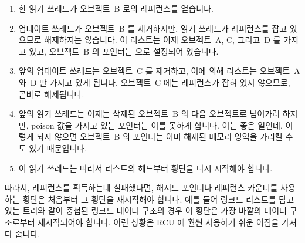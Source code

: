 \begin{enumerate}
\item	한 읽기 쓰레드가 오브젝트~B 로의 레퍼런스를 얻습니다.
\item	업데이트 쓰레드가 오브젝트~B 를 제거하지만, 읽기 쓰레드가 레퍼런스를
	잡고 있으므로 해제하지는 않습니다.
	이 리스트는 이제 오브젝트~A, C, 그리고~D 를 가지고 있고, 오브젝트~B 의
	 포인터는  으로 설정되어 있습니다.
\item	앞의 업데이트 쓰레드는 오브젝트~C 를 제거하고, 이에 의해 리스트는
	오브젝트~A 와~D 만 가지고 있게 됩니다.
	오브젝트~C 에는 레퍼런스가 잡혀 있지 않으므로, 곧바로 해제됩니다.
\item	앞의 읽기 쓰레드는 이제는 삭제된 오브젝트~B 의 다음 오브젝트로 넘어가려
	하지만, poison 값을 가지고 있는  포인터는 이를 못하게
	합니다.
	이는 좋은 일인데, 이렇게 되지 않으면 오브젝트~B 의  포인터는
	이미 해제된 메모리 영역을 가리킬 수도 있기 때문입니다.
\item	이 읽기 쓰레드는 따라서 리스트의 헤드부터 횡단을 다시 시작해야 합니다.
\iffalse

\item	A reader acquires a reference to object~B.
\item	An updater removes~object B, but refrains from freeing it because
	the reader holds a reference.
	The list now contains objects~A, C, and~D, and
	object~B's \co{->next} pointer is set to \co{HAZPTR_POISON}.
\item	The updater removes object~C, so that the list now contains
	objects~A and~D.
	Because there is no reference to object~C, it is immediately freed.
\item	The reader tries to advance to the successor of the object
	following the now-removed object~B, but the poisoned
	\co{->next} pointer prevents this.
	Which is a good thing, because object~B's \co{->next} pointer
	would otherwise point to the freelist.
\item	The reader must therefore restart its traversal from the head
	of the list.
\fi
\end{enumerate}

따라서, 레퍼런스를 획득하는데 실패했다면, 해저드 포인터나 레퍼런스 카운터를
사용하는 횡단은 처음부터 그 횡단을 재시작해야 합니다.
예를 들어 링크드 리스트를 담고 있는 트리와 같이 중첩된 링크드 데이터 구조의
경우 이 횡단은 가장 바깥의 데이터 구조로부터 재시작되어야 합니다.
이런 상황은 RCU 에 훨씬 사용하기 쉬운 이점을 가져다 줍니다.
\iffalse

Thus, when failing to acquire a reference, a hazard-pointer or
reference-counter traversal must restart that traversal from the
beginning.
In the case of nested linked data structures, for example, a
tree containing linked lists, the traversal must be restarted from
the outermost data structure.
This situation gives RCU a significant ease-of-use advantage.
\fi


